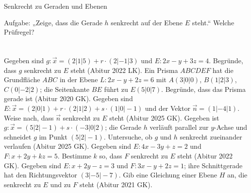 \setcounter{aufgabe}{15}

\begin{aufgabe}{Senkrecht zu Geraden und Ebenen}
\begin{teile}
\teil Aufgabe: „Zeige, dass die Gerade $h$ senkrecht auf der Ebene $E$ steht.“ Welche Prüfregel? \\  \\  \\ 
\teil Gegeben sind $g\colon \vec x = (2 | 1 | 5) + r \cdot (2 | -1 | 3)$ und $E\colon 2x - y + 3z = 4$. Begründe, dass $g$ senkrecht zu $E$ steht \hfill (Abitur 2022 LK).
\teil Ein Prisma $ABCDEF$ hat die Grundfläche $ABC$ in der Ebene $L\colon 2x - y + 2z = 6$ mit $A(3 | 0 | 0)$, $B(1 | 2 | 3)$, $C(0 | -2 | 2)$; die Seitenkante $BE$ führt zu $E(5 | 0 | 7)$. Begründe, dass das Prisma gerade ist \hfill (Abitur 2020 GK).
\teil Gegeben sind $E\colon \vec x = (2 | 0 | 1) + r \cdot (2 | 1 | 2) + s \cdot (1 | 0 | -1)$ und der Vektor $\vec n = (1 | -4 | 1)$. Weise nach, dass $\vec n$ senkrecht zu $E$ steht \hfill (Abitur 2025 GK).
\teil Gegeben ist $g\colon \vec x = (5 | 2 | -1) + s \cdot (-3 | 0 | 2)$; die Gerade $h$ verläuft parallel zur $y$-Achse und schneidet $g$ im Punkt $(5 | 2 | -1)$. Untersuche, ob $g$ und $h$ senkrecht zueinander verlaufen \hfill (Abitur 2025 GK).
\teil Gegeben sind $E\colon 4x - 3y + z = 2$ und $F\colon x + 2y + kz = 5$. Bestimme $k$ so, dass $F$ senkrecht zu $E$ steht \hfill (Abitur 2022 GK).
\teil Gegeben sind $E\colon x + 2y - z = 3$ und $F\colon 3x - y + 2z = 1$; ihre Schnittgerade hat den Richtungsvektor $(3 | -5 | -7)$. Gib eine Gleichung einer Ebene $H$ an, die senkrecht zu $E$ und zu $F$ steht \hfill (Abitur 2021 GK).
\end{teile}
\end{aufgabe}

